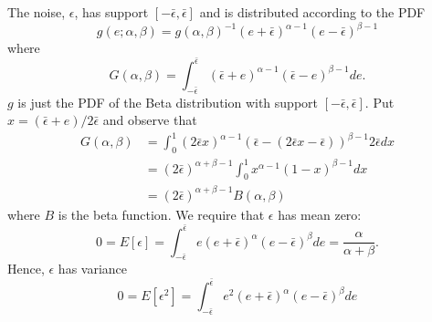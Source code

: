 \documentclass[12pt]{article}
\begin{document}
\onehalfspacing
\noindent The noise, $\epsilon$, has support $[-\bar{\epsilon},\bar{\epsilon}]$ and is distributed according to the PDF
\begin{equation}
g(e;\alpha,\beta)=g(\alpha,\beta)^{-1}(e+\bar{\epsilon})^{\alpha-1}(e-\bar{\epsilon})^{\beta-1}
\end{equation}
where
\begin{equation}
G(\alpha,\beta)=\int_{-\bar{\epsilon}}^{\bar{\epsilon}}{(\bar{\epsilon}+e)^{\alpha-1}(\bar{\epsilon}-e)^{\beta-1}de}.
\end{equation}
$g$ is just the PDF of the Beta distribution with support $[-\bar{\epsilon},\bar{\epsilon}]$. Put $x=(\bar{\epsilon}+e)/2\bar{\epsilon}$ and observe that
\begin{align}
G(\alpha,\beta)&=\int_{0}^{1}{(2\bar{\epsilon}x)^{\alpha-1}(\bar{\epsilon}-(2\bar{\epsilon}x-\bar{\epsilon}))^{\beta-1}2\bar{\epsilon}dx}\\
&=(2\bar{\epsilon})^{\alpha+\beta-1}\int_{0}^{1}{x^{\alpha-1}(1-x)^{\beta-1}dx}\\
&=(2\bar{\epsilon})^{\alpha+\beta-1}B(\alpha,\beta)
\end{align}
where $B$ is the beta function. We require that $\epsilon$ has mean zero:
\begin{equation}
0=E[\epsilon]=\int_{-\bar{\epsilon}}^{\bar{\epsilon}}{e(e+\bar{\epsilon})^{\alpha}(e-\bar{\epsilon})^{\beta}de}=\frac{\alpha}{\alpha+\beta}. 
\end{equation}
Hence, $\epsilon$ has variance 
\begin{equation}
0=E[\epsilon^{2}]=\int_{-\bar{\epsilon}}^{\bar{\epsilon}}{e^{2}(e+\bar{\epsilon})^{\alpha}(e-\bar{\epsilon})^{\beta}de}
\end{equation}
\end{document}

